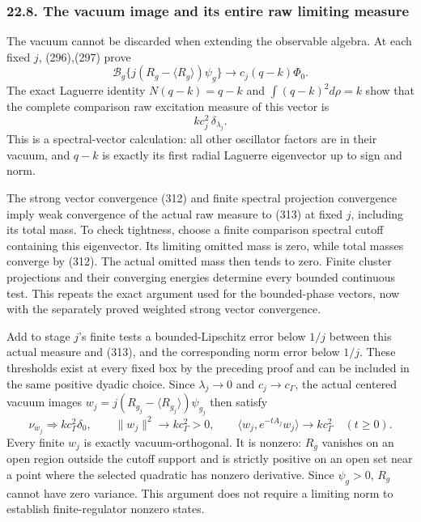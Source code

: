 \documentclass[
  11pt,
]{article}
\begin{document}
\subsubsection{22.8. The vacuum image and its entire raw limiting
measure}\label{the-vacuum-image-and-its-entire-raw-limiting-measure}

The vacuum cannot be discarded when extending the observable algebra. At
each fixed \(j\), (296),(297) prove \[
 \mathcal B_g
   \{j(R_g-\langle R_g\rangle)\psi_g\}
 \longrightarrow c_j(q-k)\Phi_0.
 \tag{312}
\] The exact Laguerre identity \(N(q-k)=q-k\) and \(\int(q-k)^2d\rho=k\)
show that the complete comparison raw excitation measure of this vector
is \[
 k c_j^2\,\delta_{\lambda_j}.
 \tag{313}
\] This is a spectral-vector calculation: all other oscillator factors
are in their vacuum, and \(q-k\) is exactly its first radial Laguerre
eigenvector up to sign and norm.

The strong vector convergence (312) and finite spectral projection
convergence imply weak convergence of the actual raw measure to (313) at
fixed \(j\), including its total mass. To check tightness, choose a
finite comparison spectral cutoff containing this eigenvector. Its
limiting omitted mass is zero, while total masses converge by (312). The
actual omitted mass then tends to zero. Finite cluster projections and
their converging energies determine every bounded continuous test. This
repeats the exact argument used for the bounded-phase vectors, now with
the separately proved weighted strong vector convergence.

Add to stage \(j\)'s finite tests a bounded-Lipschitz error below
\(1/j\) between this actual measure and (313), and the corresponding
norm error below \(1/j\). These thresholds exist at every fixed box by
the preceding proof and can be included in the same positive dyadic
choice. Since \(\lambda_j\to0\) and \(c_j\to c_\Gamma\), the actual
centered vacuum images
\(w_j=j(R_{g_j}-\langle R_{g_j}\rangle)\psi_{g_j}\) then satisfy \[
 \boxed{\nu_{w_j}\Longrightarrow k c_\Gamma^2\delta_0,\qquad
 \|w_j\|^2\to k c_\Gamma^2>0,\qquad
 \langle w_j,e^{-tA_j}w_j\rangle\to k c_\Gamma^2\quad(t\ge0).}
 \tag{314}
\] Every finite \(w_j\) is exactly vacuum-orthogonal. It is nonzero:
\(R_g\) vanishes on an open region outside the cutoff support and is
strictly positive on an open set near a point where the selected
quadratic has nonzero derivative. Since \(\psi_g>0\), \(R_g\) cannot
have zero variance. This argument does not require a limiting norm to
establish finite-regulator nonzero states.
\end{document}
